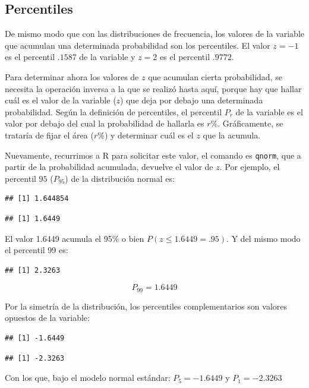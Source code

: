 \documentclass[]{book}
\begin{document}
\hypertarget{percentiles}{%
\subsection{Percentiles}\label{percentiles}}

De mismo modo que con las distribuciones de frecuencia, los valores de la variable que acumulan una determinada probabilidad son los percentiles. El valor \(z=-1\) es el percentil \(.1587\) de la variable y \(z=2\) es el percentil \(.9772\).

Para determinar ahora los valores de \(z\) que acumulan cierta probabilidad, se necesita la operación inversa a la que se realizó hasta aquí, porque hay que hallar cuál es el valor de la variable (\(z\)) que deja por debajo una determinada probabilidad. Según la definición de percentiles, el percentil \(P_{r}\) de la variable es el valor por debajo del cual la probabilidad de hallarla es \(r\%\). Gráficamente, se trataría de fijar el área (\(r\%\)) y determinar cuál es el \(z\) que la acumula.

Nuevamente, recurrimos a R para solicitar este valor, el comando es \texttt{qnorm}, que a partir de la probabilidad acumulada, devuelve el valor de \(z\). Por ejemplo, el percentil \(95\) (\(P_{95}\)) de la distribución normal es:

\begin{verbatim}
## [1] 1.644854
\end{verbatim}

\begin{verbatim}
## [1] 1.6449
\end{verbatim}

El valor 1.6449 acumula el 95\% o bien \(P(z\leq1.6449=.95)\). Y del mismo modo el percentil 99 es:

\begin{verbatim}
## [1] 2.3263
\end{verbatim}

\[P_{99}=1.6449\]

Por la simetría de la distribución, los percentiles complementarios son valores opuestos de la variable:

\begin{verbatim}
## [1] -1.6449
\end{verbatim}

\begin{verbatim}
## [1] -2.3263
\end{verbatim}

Con los que, bajo el modelo normal estándar: \(P_{5}=-1.6449\) y \(P_{1}=-2.3263\)
\end{document}
